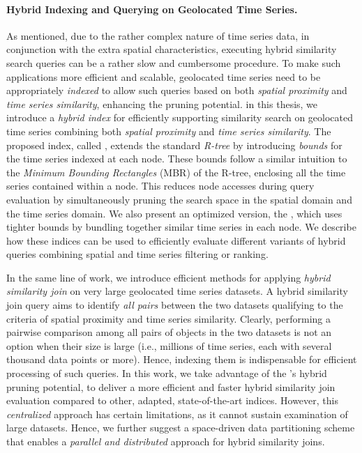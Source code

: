 \paragraph{Hybrid Indexing and Querying on Geolocated Time Series.} As mentioned, due to the rather complex nature of time series data, in conjunction with the extra spatial characteristics, executing hybrid similarity search queries can be a rather slow and cumbersome procedure. To make such applications more efficient and scalable, geolocated time series need to be appropriately \textit{indexed} to allow such queries based on both \textit{spatial proximity} and \textit{time series similarity}, enhancing the pruning potential. in this thesis, we introduce a \textit{hybrid index} for efficiently supporting similarity search on geolocated time series combining both \textit{spatial proximity} and \textit{time series similarity}. The proposed index, called \textit{\tsr}, extends the standard \textit{R-tree} by introducing \textit{bounds} for the time series indexed at each node. These bounds follow a similar intuition to the \textit{Minimum Bounding Rectangles} (MBR) of the R-tree, enclosing all the time series contained within a node. This reduces node accesses during query evaluation by simultaneously pruning the search space in the spatial domain and the time series domain. We also present an optimized version, the \textit{\btsr}, which uses tighter bounds by bundling together similar time series in each node. We describe how these indices can be used to efficiently evaluate different variants of hybrid queries combining spatial and time series filtering or ranking.

In the same line of work, we introduce efficient methods for applying \textit{hybrid similarity join} on very large geolocated time series datasets. A hybrid similarity join query aims to identify \textit{all pairs} between the two datasets qualifying to the criteria of spatial proximity and time series similarity. Clearly, performing a pairwise comparison among all pairs of objects in the two datasets is not an option when their size is large (i.e., millions of time series, each with several thousand data points or more). Hence, indexing them is indispensable for efficient processing of such queries. In this work, we take advantage of the \btsr's hybrid pruning potential, to deliver a more efficient and faster hybrid similarity join evaluation compared to other, adapted, state-of-the-art indices. However, this {\em centralized} approach has certain limitations, as it cannot sustain examination of large datasets. Hence, we further suggest a space-driven data partitioning scheme that enables a \textit{parallel and distributed} approach for hybrid similarity joins.

